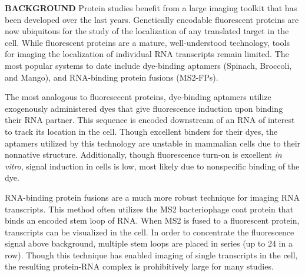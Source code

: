 \textbf{BACKGROUND}
Protein studies benefit from a large imaging toolkit that has been developed over the last  years. Genetically encodable fluorescent proteins are now ubiquitous for the study of the localization of any translated target in the cell. While fluorescent proteins are a mature, well-understood technology, tools for imaging the localization of individual RNA transcripts remain limited. The most popular systems to date include dye-binding aptamers (Spinach\cite{PaigeRNAMimicsGreen2011}, Broccoli\cite{FilonovBroccoliRapidSelection2014}, and Mango\cite{AutourFluorogenicRNAMango2018,DolgosheinaRNAMangoAptamerFluorophore2014}), and RNA-binding protein fusions (MS2-FPs).\cite{FuscoSinglemRNAMolecules2003}

The most analogous to fluoresecent proteins, dye-binding aptamers utilize exogenously administered dyes that give fluorescence induction upon binding their RNA partner.\cite{PaigeRNAMimicsGreen2011,FilonovBroccoliRapidSelection2014,AutourFluorogenicRNAMango2018,DolgosheinaRNAMangoAptamerFluorophore2014} This sequence is encoded downstream of an RNA of interest to track its location in the cell. Though excellent binders for their dyes, the aptamers utilized by this technology are unstable in mammalian cells due to their nonnative structure.\cite{EtzelSyntheticRiboswitchesPlug2017} Additionally, though fluorescence turn-on is excellent \textit{in vitro}, signal induction in cells is low, most likely due to nonspecific binding of the dye.

RNA-binding protein fusions are a much more robust technique for imaging RNA transcripts.\cite{FuscoSinglemRNAMolecules2003} This method often utilizes the MS2 bacteriophage coat protein that binds an encoded stem loop of RNA. When MS2 is fused to a fluorescent protein, transcripts can be visualized in the cell. In order to concentrate the fluorescence signal above background, multiple stem loops are placed in series (up to 24 in a row). Though this technique has enabled imaging of single transcripts in the cell,\cite{MorisakiRealtimequantificationsingle2016,FuscoSinglemRNAMolecules2003} the resulting protein-RNA complex is prohibitively large for many studies.


